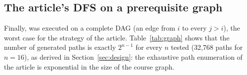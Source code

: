 \subsection{The article's DFS on a prerequisite graph}\label{sec:exp-graph}

Finally,  was executed on a complete DAG (an edge from $i$ to every $j>i$), the worst case for the strategy of the article. Table~\ref{tab:graph} shows that the number of generated paths is exactly $2^{n-1}$ for every $n$ tested (32,768 paths for $n=16$), as derived in Section~\ref{sec:design}: the exhaustive path enumeration of the article is exponential in the size of the course graph.

\begin{table}[h]
\centering
\caption{Paths generated by the prerequisite-graph DFS on a complete DAG.}\label{tab:graph}
\small

\end{table}
